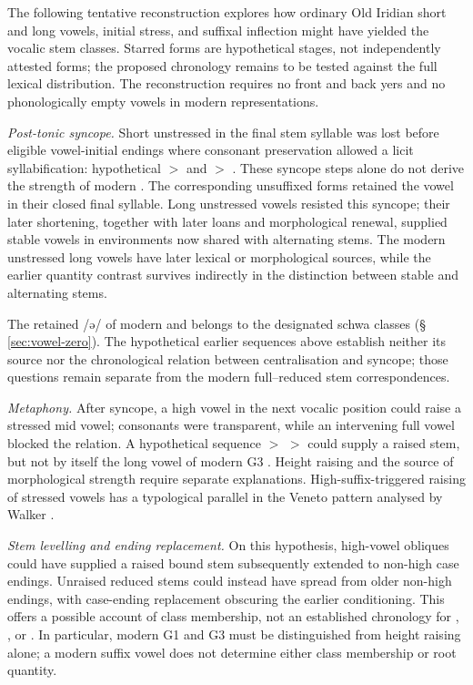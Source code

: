 The following tentative reconstruction explores how ordinary Old Iridian
short and long vowels, initial stress, and suffixal inflection might have
yielded the vocalic stem classes. Starred forms are hypothetical stages,
not independently attested forms; the proposed chronology remains to be
tested against the full lexical distribution. The reconstruction requires no front
and back yers and no phonologically empty vowels in modern representations.

\noindent\textit{Post-tonic syncope.}\quad
Short unstressed  in the final stem syllable was lost before eligible
vowel-initial endings where consonant preservation allowed a licit
syllabification: hypothetical  $>$  and
 $>$ . These syncope steps alone do not derive
the strength of modern . The corresponding unsuffixed forms retained the vowel in their
closed final syllable. Long unstressed vowels resisted this syncope; their
later shortening, together with later loans and morphological renewal, supplied
stable vowels in environments now shared with alternating stems. The modern unstressed long vowels have later lexical or morphological
sources, while the earlier quantity contrast survives indirectly in the
distinction between stable and alternating stems.

The retained /ə/ of modern  and  belongs to
the designated schwa classes (§\,\ref{sec:vowel-zero}). The hypothetical
earlier  sequences above establish neither its source nor the
chronological relation between centralisation and syncope; those questions
remain separate from the modern full--reduced stem correspondences.

\noindent\textit{Metaphony.}\quad
After syncope, a high vowel in the next vocalic position could raise a stressed
mid vowel; consonants were transparent, while an intervening full vowel blocked
the relation. A hypothetical sequence  $>$ 
$>$  could supply a raised stem, but not by itself the long
vowel of modern G3 . Height raising and the source of
morphological strength require separate explanations. High-suffix-triggered
raising of stressed vowels has a typological parallel in the Veneto pattern
analysed by Walker \cite{walker2001}.

\noindent\textit{Stem levelling and ending replacement.}\quad
On this hypothesis, high-vowel obliques could have supplied a raised bound
stem subsequently extended to non-high case endings. Unraised reduced stems
could instead have spread from older non-high endings, with
case-ending replacement obscuring the earlier conditioning. This offers a
possible account of class membership, not an established chronology for
, , or . In particular, modern G1 and G3
must be distinguished from height raising alone; a modern suffix vowel does
not determine either class membership or root quantity.

